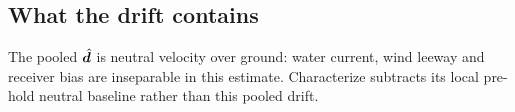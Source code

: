 \subsection{What the drift contains}

The pooled $\hat{\bm d}$ is neutral velocity over ground: water current, wind
leeway and receiver bias are inseparable in this estimate. Characterize subtracts
its local pre-hold neutral baseline rather than this pooled drift.

